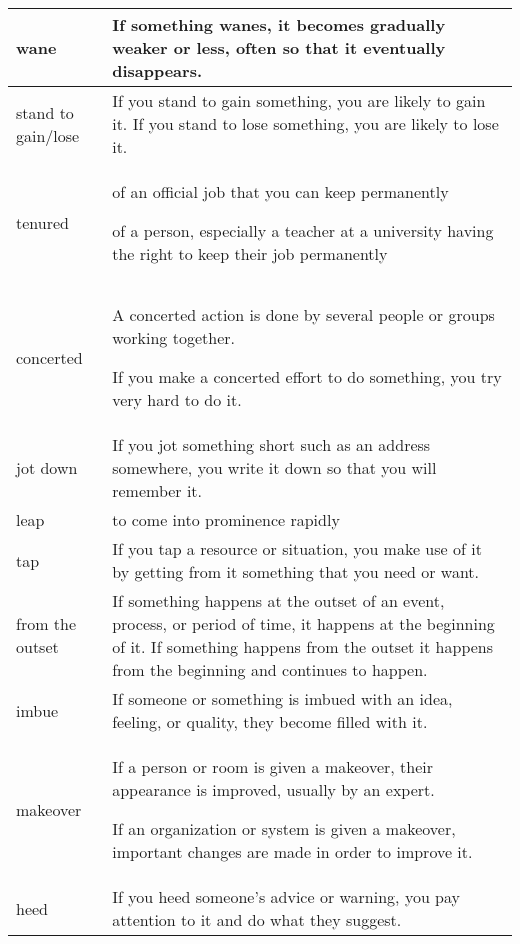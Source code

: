 \documentclass{article}
\begin{document}
\begin{center}
\begin{longtable}{|l|p{9cm}|}
\hline
wane
&
If something wanes, it becomes gradually weaker or less, often so that it eventually disappears.
\\

\hline
stand to gain/lose
&
If you stand to gain something, you are likely to gain it. If you stand to lose something, you are likely to lose it.
\\

\hline
tenured
&
of an official job that you can keep permanently
\par
of a person, especially a teacher at a university having the right to keep their job permanently
\\

\hline
concerted
&
A concerted action is done by several people or groups working together.
\par
If you make a concerted effort to do something, you try very hard to do it.
\\

\hline
jot down
&
If you jot something short such as an address somewhere, you write it down so that you will remember it.
\\

\hline
leap
&
to come into prominence rapidly
\\

\hline
tap
&
If you tap a resource or situation, you make use of it by getting from it something that you need or want.
\\

\hline
from the outset
&
If something happens at the outset of an event, process, or period of time, it happens at the beginning of it. If something happens from the outset it happens from the beginning and continues to happen.
\\

\hline
imbue
&
If someone or something is imbued with an idea, feeling, or quality, they become filled with it.
\\

\hline
makeover
&
If a person or room is given a makeover, their appearance is improved, usually by an expert.
\par
If an organization or system is given a makeover, important changes are made in order to improve it.
\\

\hline
heed
&
If you heed someone's advice or warning, you pay attention to it and do what they suggest.
\\

\hline


\end{longtable}
\end{center}
\end{document}
